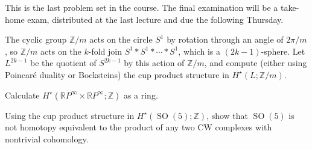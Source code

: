 \documentclass[12pt]{pset}
\author{Jim Fowler}
\date{Spring 2012}
\newcommand{\RP}{\mathbb{R}P}
\newcommand{\Z}{\mathbb{Z}}
\DeclareMathOperator{\SO}{SO}
\begin{document}
\maketitle


\noindent
This is the last problem set in the course.  The final examination
will be a take-home exam, distributed at the last lecture and due the
following Thursday.

\begin{problem}
  The cyclic group $\Z/m$ acts on the circle $S^1$ by rotation through
  an angle of $2\pi/m$, so $\Z/m$ acts on the $k$-fold join $S^1 \ast
  S^1 \ast \cdots \ast S^1$, which is a $(2k-1)$-sphere.  Let
  $L^{2k-1}$ be the quotient of $S^{2k-1}$ by this action of $\Z/m$,
  and compute (either using Poincar\'e duality or Bocksteins) the cup
  product structure in $H^\star(L;\Z/m)$.
\end{problem}

\begin{problem}
  Calculate $H^\star(\RP^\infty \times \RP^\infty;\Z)$ as a ring.
\end{problem}

\begin{problem}
  Using the cup product structure in $H^\star(\SO(5);\Z)$, show that
  $\SO(5)$ is not homotopy equivalent to the product of any two CW
  complexes with nontrivial cohomology.
\end{problem}

\vfill

\pagebreak
\null
\end{document}
